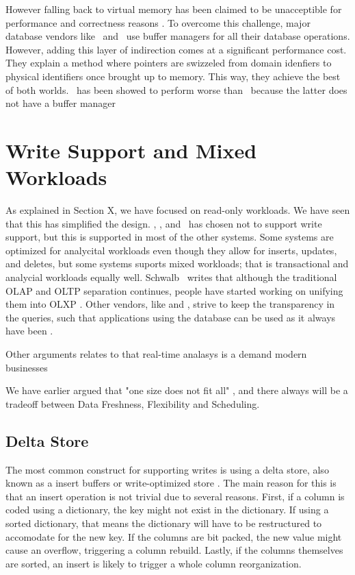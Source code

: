 However falling back to virtual memory has been claimed to be unacceptible for performance and correctness reasons \cite{Graefe2014-ds}. To overcome this challenge, major database vendors like \oracle~and \mssql~use buffer managers for all their database operations. However, adding this layer of indirection comes at a significant performance cost. They explain a method where pointers are swizzeled from domain idenfiers to physical identifiers once brought up to memory. This way, they achieve the best of both worlds.  \mssql~has been showed to perform worse than \vertipaq~because the latter does not have a buffer manager \cite{Ferrari2012-hm}


\section{Write Support and Mixed Workloads}
\label{sec:Write Support and Mixed Workloads}
As explained in Section X, we have focused on read-only workloads. We have seen that this has simplified the design. \tableau, \qlikview, and \vertipaq~has chosen not to support write support, but this is supported in most of the other systems. Some systems are optimized for analycital workloads even though they allow for inserts, updates, and deletes, but some systems suports mixed workloads; that is transactional and analycial workloads equally well. Schwalb \ea~writes that although the traditional OLAP and OLTP separation continues, people have started working on unifying them \cite{Schwalb2014-hn} into OLXP \cite{Plattner2014-fr}. Other vendors, like \oracle and \saph, strive to keep the transparency in the queries, such that applications using the database can be used as it always have been \cite{Lahiri2015-mz, Farber2012-vh}.

Other arguments relates to that real-time analasys is a demand modern businesses \cite{Primsch2011-ij}

We have earlier argued that "one size does not fit all" \cite{Psaroudakis2014-ma}, and there always will be a tradeoff between Data Freshness, Flexibility and Scheduling.

\subsection{Delta Store}
\label{sub:Delta Store}
The most common construct for supporting writes is using a delta store, also known as a insert buffers or write-optimized store \cite{Raman2013-em, Stonebraker2005-qz}. The main reason for this is that an insert operation is not trivial due to several reasons. First, if a column is coded using a dictionary, the key might not exist in the dictionary. If using a sorted dictionary, that means the dictionary will have to be restructured to accomodate for the new key. If the columns are bit packed, the new value might cause an overflow, triggering a column rebuild. Lastly, if the columns themselves are sorted, an insert is likely to trigger a whole column reorganization.


